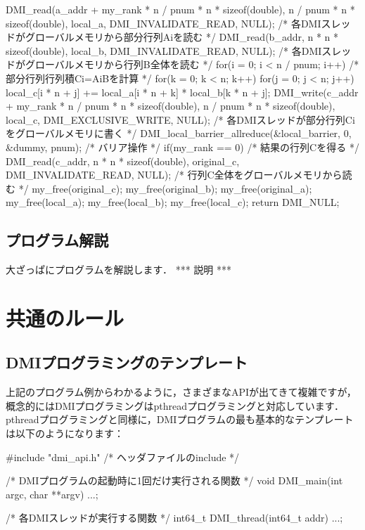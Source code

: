\documentclass[report,12pt]{jsbook}
\begin{document}
\begin{code}
{  DMI_read(a_addr + my_rank * n / pnum * n * sizeof(double), n / pnum * n * sizeof(double), local_a, DMI_INVALIDATE_READ, NULL);  /* 各DMIスレッドがグローバルメモリから部分行列Aiを読む */
  DMI_read(b_addr, n * n * sizeof(double), local_b, DMI_INVALIDATE_READ, NULL);  /* 各DMIスレッドがグローバルメモリから行列B全体を読む */
  for(i = 0; i < n / pnum; i++)  /* 部分行列行列積Ci=AiBを計算 */
    {
      for(k = 0; k < n; k++)
        {
          for(j = 0; j < n; j++)
            {
              local_c[i * n + j] += local_a[i * n + k] * local_b[k * n + j];
            }
        }
    }
  DMI_write(c_addr + my_rank * n / pnum * n * sizeof(double), n / pnum * n * sizeof(double), local_c, DMI_EXCLUSIVE_WRITE, NULL);  /* 各DMIスレッドが部分行列Ciをグローバルメモリに書く */
  DMI_local_barrier_allreduce(&local_barrier, 0, &dummy, pnum);  /* バリア操作 */
  if(my_rank == 0)  /* 結果の行列Cを得る */
    {
      DMI_read(c_addr, n * n * sizeof(double), original_c, DMI_INVALIDATE_READ, NULL);  /* 行列C全体をグローバルメモリから読む */
      my_free(original_c);
      my_free(original_b);
      my_free(original_a);
    }
  my_free(local_a);
  my_free(local_b);
  my_free(local_c);
  return DMI_NULL;
}
\end{code}

\subsection{プログラム解説}

大ざっぱにプログラムを解説します．
*** 説明 ***

\section{共通のルール}

\subsection{DMIプログラミングのテンプレート}

上記のプログラム例からわかるように，さまざまなAPIが出てきて複雑ですが，
概念的にはDMIプログラミングはpthreadプログラミングと対応しています．
pthreadプログラミングと同様に，DMIプログラムの最も基本的なテンプレートは以下のようになります：
\begin{code}
#include "dmi_api.h"  /* ヘッダファイルのinclude */

/* DMIプログラムの起動時に1回だけ実行される関数 */
void DMI_main(int argc, char **argv)
{
  ...;
}

/* 各DMIスレッドが実行する関数 */
int64_t DMI_thread(int64_t addr)
{
  ...;
}
\end{code}
\end{document}
